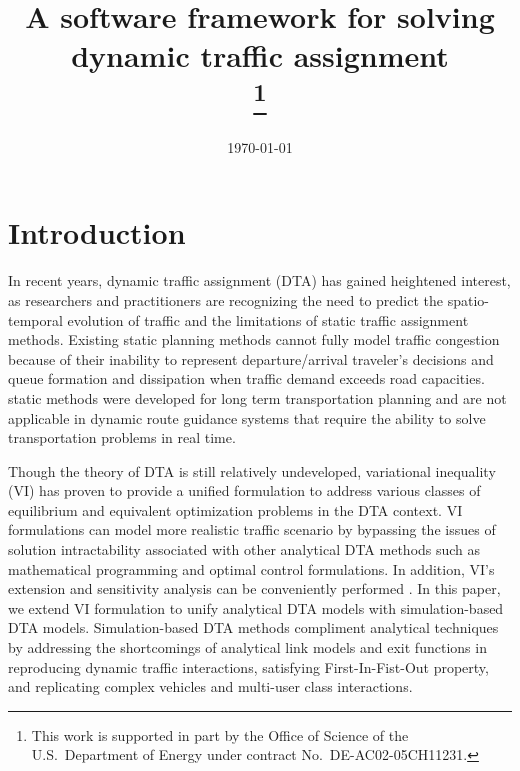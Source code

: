 \documentclass[conference]{IEEEtran}
\date{\today}
\renewcommand{\:}{\mathrel{\coloneqq}}
\renewcommand{\=}{\ensuremath{\eqqcolon}}
\newcommand{\0}{\ensuremath{\boldsymbol{0}}}
\begin{document}
\title{A software framework for solving dynamic traffic assignment\\
\thanks{This work is supported in part by the Office of Science of the
 U.S.~Department of Energy under contract No.~DE-AC02-05CH11231.}
}

\author{
}

\maketitle

\begin{abstract}
\end{abstract}

\begin{IEEEkeywords}
\end{IEEEkeywords}

\section{Introduction}
 In recent years, dynamic traffic assignment (DTA) has gained heightened interest, as researchers and practitioners are recognizing the need to predict the spatio-temporal evolution of traffic and the limitations of  static traffic assignment methods\cite{peeta2001foundations}. Existing static planning methods cannot fully model traffic congestion because of their inability to represent departure/arrival traveler's decisions and queue formation and dissipation when traffic demand exceeds road capacities\cite{nie2010solving}. static methods were developed for long term transportation planning and are not applicable in dynamic route guidance systems that require the ability to solve transportation problems in real time\cite{boyce1989route}.
 
Though the theory of DTA is still relatively undeveloped, variational inequality (VI) has proven to provide a unified formulation to address various classes of equilibrium and equivalent optimization problems in the DTA context. VI formulations can model more realistic traffic scenario by bypassing the issues of solution intractability associated with other analytical DTA methods such as mathematical programming and optimal control formulations. In addition, VI's extension and sensitivity analysis can be conveniently performed \cite{peeta2001foundations}. In this paper, we extend VI formulation to unify analytical DTA models with simulation-based DTA models. Simulation-based DTA methods compliment analytical techniques by addressing the shortcomings of analytical link models and exit functions in reproducing dynamic traffic interactions, satisfying First-In-Fist-Out property, and replicating complex vehicles and multi-user class interactions.
\end{document}
